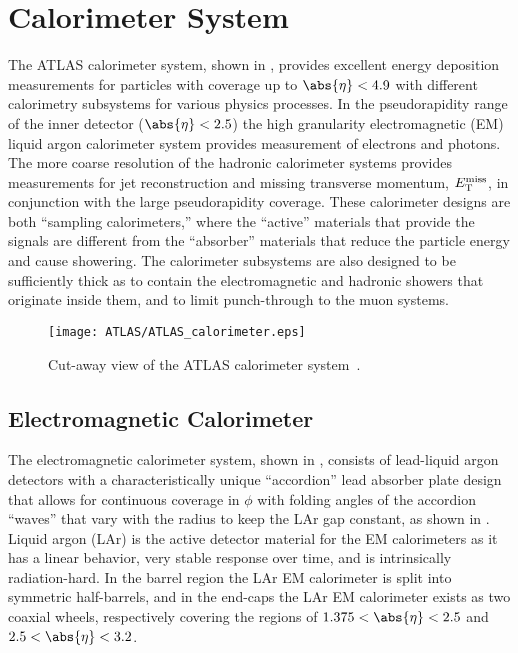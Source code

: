 \section{Calorimeter System}\label{sec:ATLAS_calo}

The ATLAS calorimeter system, shown in , provides excellent energy deposition measurements for particles with coverage up to $\abs{\eta} < 4.9$ with different calorimetry subsystems for various physics processes.
In the pseudorapidity range of the inner detector ($\abs{\eta} < 2.5$) the high granularity electromagnetic (EM) liquid argon calorimeter system provides measurement of electrons and photons.
The more coarse resolution of the hadronic calorimeter systems provides measurements for jet reconstruction and missing transverse momentum, $E_{\mathrm{T}}^{\mathrm{miss}}$, in conjunction with the large pseudorapidity coverage.
These calorimeter designs are both ``sampling calorimeters,'' where the ``active'' materials that provide the signals are different from the ``absorber'' materials that reduce the particle energy and cause showering.
The calorimeter subsystems are also designed to be sufficiently thick as to contain the electromagnetic and hadronic showers that originate inside them, and to limit punch-through to the muon systems.

\begin{figure}[htbp]
 \centering
 \texttt{[image: ATLAS/ATLAS\_calorimeter.eps]}
 \caption[Cut-away view of the ATLAS calorimeter system.]{%
  Cut-away view of the ATLAS calorimeter system~\cite{Pequenao:1095927}.}\label{fig:ATLAS_calorimeter}
\end{figure}

\subsection{Electromagnetic Calorimeter}\label{sec:ATLAS_electromagnetic_calorimeter}

The electromagnetic calorimeter system, shown in , consists of lead-liquid argon detectors with a characteristically unique ``accordion'' lead absorber plate design that allows for continuous coverage in $\phi$ with folding angles of the accordion ``waves'' that vary with the radius to keep the LAr gap constant, as shown in .
Liquid argon (LAr) is the active detector material for the EM calorimeters as it has a linear behavior, very stable response over time, and is intrinsically radiation-hard.
In the barrel region the LAr EM calorimeter is split into symmetric half-barrels, and in the end-caps the LAr EM calorimeter exists as two coaxial wheels, respectively covering the regions of $1.375 < \abs{\eta} < 2.5$ and $2.5 < \abs{\eta} < 3.2$.

